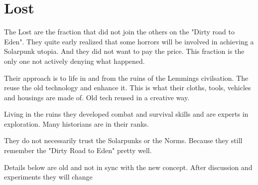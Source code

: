 \section{Lost}

The Lost are the fraction that did not join the others on the "Dirty road to Eden". They quite early realized that some horrors will be involved in achieving a Solarpunk utopia. And they did not want to pay the price. This fraction is the only one not actively denying what happened.

Their approach is to life in and from the ruins of the Lemmings civilsation. The reuse the old technology and enhance it. This is what their cloths, tools, vehicles and housings are made of. Old tech reused in a creative way.

Living in the ruins they developed combat and survival skills and are experts in exploration.
Many historians are in their ranks.

They do not necessarily trust the Solarpunks or the Norms. Because they still remember the "Dirty Road to Eden" pretty well.


\begin{warning}
    Details below are old and not in sync with the new concept. After discussion and experiments they will change
\end{warning}


